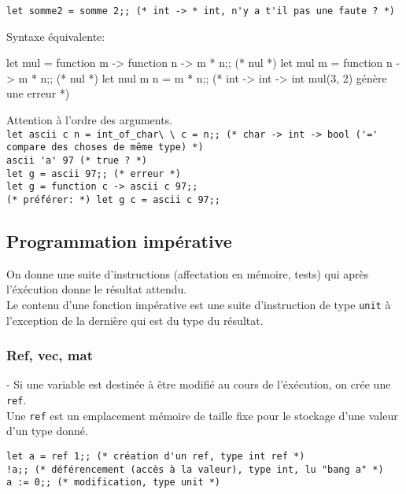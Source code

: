 \documentclass{article}
\newcommand{\code}[1]{\lstinline[style = mystyle]{#1}}
\begin{document}
						\code{let somme2 = somme 2;; (* int -> * int, n'y a t'il pas une faute ? *)}
						
						Syntaxe équivalente:\\
						\begin{case}
	let mul = function m -> function n -> m * n;; (* nul *)
	let mul m = function n -> m * n;; (* nul *)
	let mul m n = m * n;;
	(* int -> int -> int
	mul(3, 2) génère une erreur *)
						\end{case}
						
						Attention à l'ordre des arguments.\\
						\code{let ascii c n = int_of_char\ \ c = n;; (* char -> int -> bool ('=' compare des choses de même type) *)}\\
						\code{ascii 'a' 97 (* true ? *)}\\ %
						\code{let g = ascii 97;; (* erreur *)}\\
						\code{let g = function c -> ascii c 97;;}\\
						\code{(* préférer: *) let g c = ascii c 97;;}
					
			\subsection{Programmation impérative}
		
			On donne une suite d'instructions (affectation en mémoire, tests) qui après l'éxécution donne le résultat attendu.\\
			Le contenu d'une fonction impérative est une suite d'instruction de type \code{unit} à l'exception de la dernière qui est du type du résultat.
			
			\subsubsection{Ref, vec, mat}
			
				- Si une variable est destinée à être modifié au cours de l'éxécution, on crée une \code{ref}.\\
				Une \code{ref} est un emplacement mémoire de taille fixe pour le stockage d'une valeur d'un type donné.
				
				\code{let a = ref 1;; (* création d'un ref, type int ref *)}\\
				\code{!a;; (* déférencement (accès à la valeur), type int, lu "bang a" *)}\\
				\code{a := 0;; (* modification, type unit *)}
\end{document}
